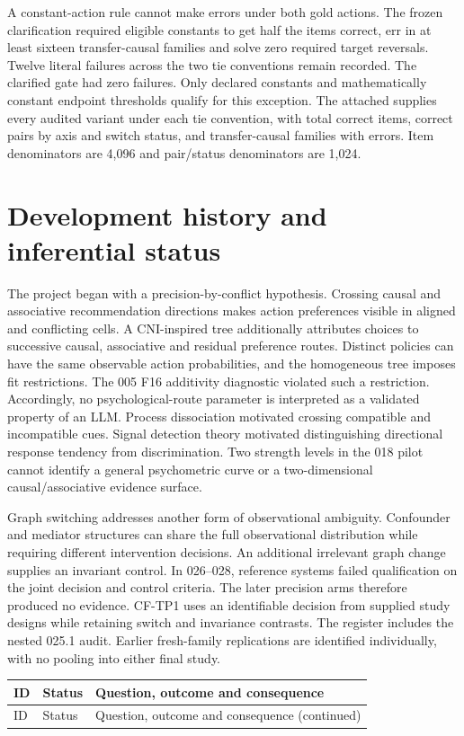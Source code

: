 A constant-action rule cannot make errors under both gold actions. The frozen clarification required eligible constants to get half the items correct, err in at least sixteen transfer-causal families and solve zero required target reversals. Twelve literal failures across the two tie conventions remain recorded. The clarified gate had zero failures. Only declared constants and mathematically constant endpoint thresholds qualify for this exception. The attached  supplies every audited variant under each tie convention, with total correct items, correct pairs by axis and switch status, and transfer-causal families with errors. Item denominators are 4,096 and pair/status denominators are 1,024.

\section{Development history and inferential status}
The project began with a precision-by-conflict hypothesis. Crossing causal and associative recommendation directions makes action preferences visible in aligned and conflicting cells. A CNI-inspired tree additionally attributes choices to successive causal, associative and residual preference routes. Distinct policies can have the same observable action probabilities, and the homogeneous tree imposes fit restrictions. The 005 F16 additivity diagnostic violated such a restriction. Accordingly, no psychological-route parameter is interpreted as a validated property of an LLM. Process dissociation motivated crossing compatible and incompatible cues. Signal detection theory motivated distinguishing directional response tendency from discrimination. Two strength levels in the 018 pilot cannot identify a general psychometric curve or a two-dimensional causal/associative evidence surface.

Graph switching addresses another form of observational ambiguity. Confounder and mediator structures can share the full observational distribution while requiring different intervention decisions. An additional irrelevant graph change supplies an invariant control. In 026--028, reference systems failed qualification on the joint decision and control criteria. The later precision arms therefore produced no evidence. CF-TP1 uses an identifiable decision from supplied study designs while retaining switch and invariance contrasts. The register includes the nested 025.1 audit. Earlier fresh-family replications are identified individually, with no pooling into either final study.
{\small\begin{longtable}{@{}p{.065\linewidth}>{\raggedright\arraybackslash}p{.22\linewidth}>{\raggedright\arraybackslash}p{.64\linewidth}@{}}
\toprule ID & Status & Question, outcome and consequence\\\midrule\endfirsthead
\toprule ID & Status & Question, outcome and consequence (continued)\\\midrule\endhead

\end{longtable}}

